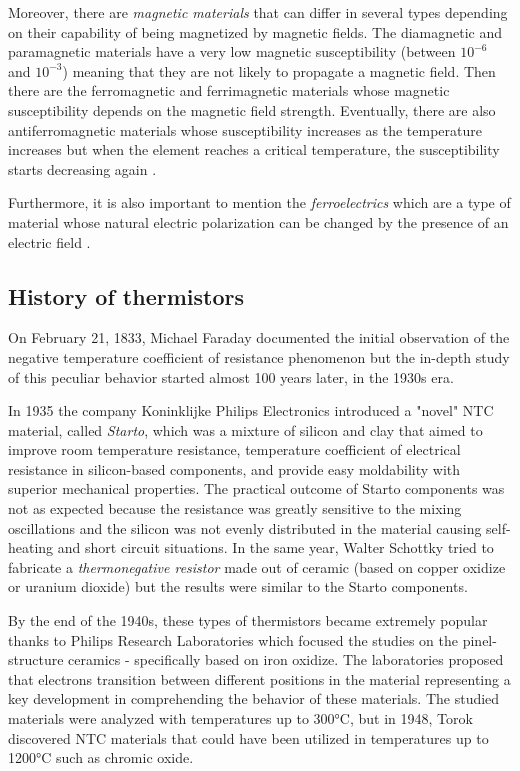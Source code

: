 Moreover, there are \textsl{magnetic materials} that can differ in several types depending on their capability of being magnetized by magnetic fields. The diamagnetic and paramagnetic materials have a very low magnetic susceptibility (between $10^{-6}$ and $10^{-3}$) meaning that they are not likely to propagate a magnetic field. Then there are the ferromagnetic and ferrimagnetic materials whose magnetic susceptibility depends on the magnetic field strength. Eventually, there are also antiferromagnetic materials whose susceptibility increases as the temperature increases but when the element reaches a critical temperature, the susceptibility starts decreasing again \cite{Gupta20163}\cite{heck2013magnetic}.

Furthermore, it is also important to mention the \textsl{ferroelectrics} which are a type of material whose natural electric polarization can be changed by the presence of an electric field \cite{Gupta20163}\cite{whatmore2017ferroelectric}.

\subsection{History of thermistors}
On February 21, 1833, Michael Faraday documented the initial observation of the negative temperature coefficient of resistance phenomenon but the in-depth study of this peculiar behavior started almost 100 years later, in the 1930s era.

In 1935 the company Koninklijke Philips Electronics introduced a "novel" NTC material, called \textsl{Starto}, which was a mixture of silicon and clay that aimed to improve room temperature resistance, temperature coefficient of electrical resistance in silicon-based components, and provide easy moldability with superior mechanical properties. The practical outcome of Starto components was not as expected because the resistance was greatly sensitive to the mixing oscillations and the silicon was not evenly distributed in the material causing self-heating and short circuit situations. In the same year, Walter Schottky tried to fabricate a \textsl{thermonegative resistor} made out of ceramic (based on copper oxidize or uranium dioxide) but the results were similar to the Starto components.

By the end of the 1940s, these types of thermistors became extremely popular thanks to Philips Research Laboratories which focused the studies on the pinel-structure ceramics - specifically based on iron oxidize. The laboratories proposed that electrons transition between different positions in the material representing a key development in comprehending the behavior of these materials. The studied materials were analyzed with temperatures up to 300°C, but in 1948, Torok discovered NTC materials that could have been utilized in temperatures up to 1200°C such as chromic oxide. 

